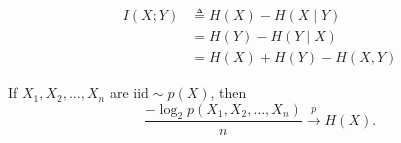 \begin{definition}
  
  \begin{align*}
    I(X;Y) &\triangleq H(X) - H(X \mid Y) \\
           &= H(Y) - H(Y \mid X) \\
           &= H(X) + H(Y) - H(X,Y)
  \end{align*}
  
\end{definition}

\begin{theorem}
  If $X_1, X_2, \ldots, X_n$ are $\textrm{iid} \sim p(X)$, then
  \begin{displaymath}
    \frac{-\log_2 p(X_1,X_2,\ldots,X_n)}{n} \overset{p}{\longrightarrow} H(X)
  .\end{displaymath}
  
\end{theorem}
